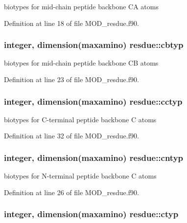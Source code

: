 biotypes for mid-\/chain peptide backbone C\-A atoms 



Definition at line 18 of file M\-O\-D\-\_\-resdue.\-f90.

\hypertarget{classresdue_a5c7194799b5b4c659a3e08ccf6a07a82}{
\subsubsection[{cbtyp}]{\setlength{\rightskip}{0pt plus 5cm}integer, dimension(maxamino) resdue\-::cbtyp}}\label{classresdue_a5c7194799b5b4c659a3e08ccf6a07a82}


biotypes for mid-\/chain peptide backbone C\-B atoms 



Definition at line 23 of file M\-O\-D\-\_\-resdue.\-f90.

\hypertarget{classresdue_a9693e50a65750bbb7dec2cdae61254d3}{
\subsubsection[{cctyp}]{\setlength{\rightskip}{0pt plus 5cm}integer, dimension(maxamino) resdue\-::cctyp}}\label{classresdue_a9693e50a65750bbb7dec2cdae61254d3}


biotypes for C-\/terminal peptide backbone C atoms 



Definition at line 32 of file M\-O\-D\-\_\-resdue.\-f90.

\hypertarget{classresdue_a61b1e7c7163ff480275984e367a3dffa}{
\subsubsection[{cntyp}]{\setlength{\rightskip}{0pt plus 5cm}integer, dimension(maxamino) resdue\-::cntyp}}\label{classresdue_a61b1e7c7163ff480275984e367a3dffa}


biotypes for N-\/terminal peptide backbone C atoms 



Definition at line 26 of file M\-O\-D\-\_\-resdue.\-f90.

\hypertarget{classresdue_ab12245fc7d0a317c3184c5711ed6261d}{
\subsubsection[{ctyp}]{\setlength{\rightskip}{0pt plus 5cm}integer, dimension(maxamino) resdue\-::ctyp}}\label{classresdue_ab12245fc7d0a317c3184c5711ed6261d}


